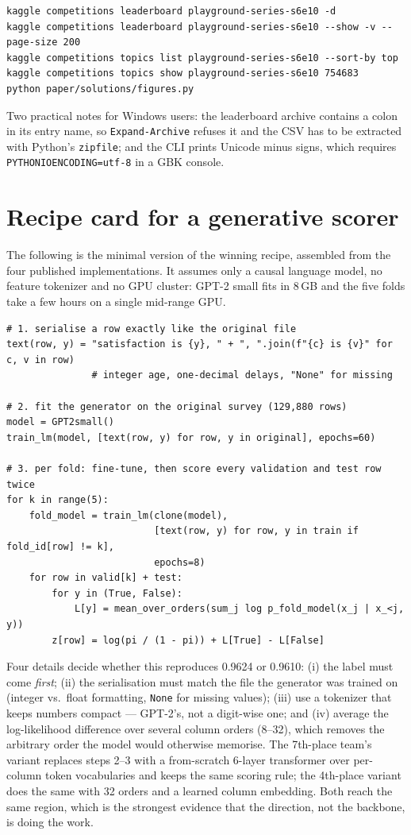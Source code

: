 \begin{verbatim}
kaggle competitions leaderboard playground-series-s6e10 -d
kaggle competitions leaderboard playground-series-s6e10 --show -v --page-size 200
kaggle competitions topics list playground-series-s6e10 --sort-by top
kaggle competitions topics show playground-series-s6e10 754683
python paper/solutions/figures.py
\end{verbatim}

Two practical notes for Windows users: the leaderboard archive contains a colon in its
entry name, so \texttt{Expand-Archive} refuses it and the CSV has to be extracted with
Python's \texttt{zipfile}; and the CLI prints Unicode minus signs, which requires
\texttt{PYTHONIOENCODING=utf-8} in a GBK console.

\appendix
\setlength{\emergencystretch}{2em}
\section{Recipe card for a generative scorer}
\label{app:recipe}

The following is the minimal version of the winning recipe, assembled from the four
published implementations. It assumes only a causal language model, no feature tokenizer
and no GPU cluster: GPT-2 small fits in 8\,GB and the five folds take a few hours on a
single mid-range GPU.

\begin{verbatim}
# 1. serialise a row exactly like the original file
text(row, y) = "satisfaction is {y}, " + ", ".join(f"{c} is {v}" for c, v in row)
               # integer age, one-decimal delays, "None" for missing

# 2. fit the generator on the original survey (129,880 rows)
model = GPT2small()
train_lm(model, [text(row, y) for row, y in original], epochs=60)

# 3. per fold: fine-tune, then score every validation and test row twice
for k in range(5):
    fold_model = train_lm(clone(model),
                          [text(row, y) for row, y in train if fold_id[row] != k],
                          epochs=8)
    for row in valid[k] + test:
        for y in (True, False):
            L[y] = mean_over_orders(sum_j log p_fold_model(x_j | x_<j, y))
        z[row] = log(pi / (1 - pi)) + L[True] - L[False]
\end{verbatim}

Four details decide whether this reproduces 0.9624 or 0.9610: (i) the label must come
\emph{first}; (ii) the serialisation must match the file the generator was trained on
(integer vs.\ float formatting, \texttt{None} for missing values); (iii) use a tokenizer
that keeps numbers compact --- GPT-2's, not a digit-wise one; and (iv) average the
log-likelihood difference over several column orders (8--32), which removes the arbitrary
order the model would otherwise memorise. The 7th-place team's variant replaces steps 2--3
with a from-scratch 6-layer transformer over per-column token vocabularies and keeps the
same scoring rule; the 4th-place variant does the same with 32 orders and a learned column
embedding. Both reach the same region, which is the strongest evidence that the direction,
not the backbone, is doing the work.

\sloppy



